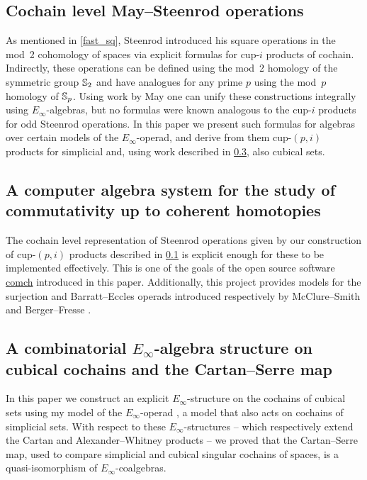\documentclass{amsart}
\begin{document}
\subsection{Cochain level May--Steenrod operations {\rm \cite{medina2021may_st}}} \label{may_st}

As mentioned in \cref{fast_sq}, Steenrod introduced his square operations in the mod~2 cohomology of spaces via explicit formulas for cup-$i$ products of cochain.
Indirectly, these operations can be defined using the mod~2 homology of the symmetric group $\mathbb{S}_2$ and have analogues for any prime $p$ using the mod~$p$ homology of $\mathbb{S}_p$.
Using work by May one can unify these constructions integrally using $E_\infty$-algebras, but no formulas were known analogous to the cup-$i$ products for odd Steenrod operations.
In this paper we present such formulas for algebras over certain models of the $E_\infty$-operad, and derive from them cup-$(p,i)$ products for simplicial and, using work described in \cref{cube_einfty}, also cubical sets.

\subsection{A computer algebra system for the study of commutativity up to coherent homotopies {\rm \cite{medina2021comch}}} \label{comch}

The cochain level representation of Steenrod operations given by our construction of cup-$(p,i)$ products described in \cref{may_st} is explicit enough for these to be implemented effectively.
This is one of the goals of the open source software \href{https://comch.readthedocs.io/en/latest/}{comch} introduced in this paper.
Additionally, this project provides models for the surjection and Barratt--Eccles operads introduced respectively by McClure--Smith \cite{mcclure2003multivariable} and Berger--Fresse \cite{berger2004combinatorial}.

\subsection{A combinatorial $E_\infty$-algebra structure on cubical cochains and the Cartan--Serre map {\rm \cite{medina2022cube_einfty}}} \label{cube_einfty}

In this paper we construct an explicit $E_\infty$-structure on the cochains of cubical sets using my model of the $E_\infty$-operad \cite{medina2020prop1}, a model that also acts on cochains of simplicial sets.
With respect to these $E_\infty$-structures -- which respectively extend the Cartan and Alexander--Whitney products -- we proved that the Cartan--Serre map, used to compare simplicial and cubical singular cochains of spaces, is a quasi-isomorphism of $E_\infty$-coalgebras.
\end{document}
